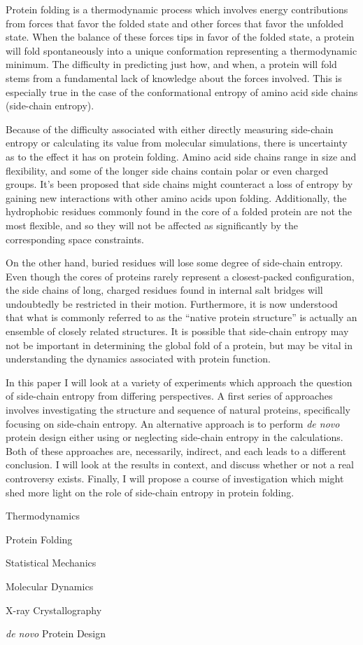 Protein folding is a thermodynamic process which involves energy contributions from forces that favor the folded state and other forces that favor the unfolded state. When the balance of these forces tips in favor of the folded state, a protein will fold spontaneously into a unique conformation representing a thermodynamic minimum. The difficulty in predicting just how, and when, a protein will fold stems from a fundamental lack of knowledge about the forces involved. This is especially true in the case of the conformational entropy of amino acid side chains (side-chain entropy).

Because of the difficulty associated with either directly measuring side-chain entropy or calculating its value from molecular simulations, there is uncertainty as to the effect it has on protein folding. Amino acid side chains range in size and flexibility, and some of the longer side chains contain polar or even charged groups. It’s been proposed that side chains might counteract a loss of entropy by gaining new interactions with other amino acids upon folding. Additionally, the hydrophobic residues commonly found in the core of a folded protein are not the most flexible, and so they will not be affected as significantly by the corresponding space constraints.

On the other hand, buried residues will lose some degree of side-chain entropy. Even though the cores of proteins rarely represent a closest-packed configuration, the side chains of long, charged residues found in internal salt bridges will undoubtedly be restricted in their motion. Furthermore, it is now understood that what is commonly referred to as the ``native protein structure'' is actually an ensemble of closely related structures. It is possible that side-chain entropy may not be important in determining the global fold of a protein, but may be vital in understanding the dynamics associated with protein function.

In this paper I will look at a variety of experiments which approach the question of side-chain entropy from differing perspectives. A first series of approaches involves investigating the structure and sequence of natural proteins, specifically focusing on side-chain entropy. An alternative approach is to perform \emph{de novo} protein design either using or neglecting side-chain entropy in the calculations. Both of these approaches are, necessarily, indirect, and each leads to a different conclusion. I will look at the results in context, and discuss whether or not a real controversy exists. Finally, I will propose a course of investigation which might shed more light on the role of side-chain entropy in protein folding.

\begin{description}
	\item[Topics] 
	\item Thermodynamics 
	\item Protein Folding
	\item Statistical Mechanics
	\item Molecular Dynamics
	\item X-ray Crystallography
	\item \emph{de novo} Protein Design
\end{description}